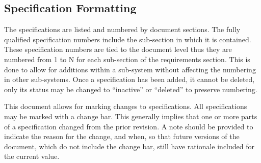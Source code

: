 
\subsection{Specification Formatting}
\label{ssec:Intro_SpecFormatting}

The specifications are listed and numbered by document sections. 
The fully qualified specification numbers include the sub-section in which it is contained. 
These specification numbers are tied to the document level thus they are numbered from 1 to N for each sub-section of the requirements section. 
This is done to allow for additions within a sub-system without affecting the numbering in other sub-systems. 
Once a specification has been added, it cannot be deleted, only its status may be changed to ``inactive'' or ``deleted'' to preserve numbering.

This document allows for marking changes to specifications.
All specifications may be marked with a change bar.
This generally implies that one or more parts of a specification changed from the prior revision.
A note should be provided to indicate the reason for the change, and when, so that future versions of the document, which do not include the change bar, still have rationale included for the current value.


